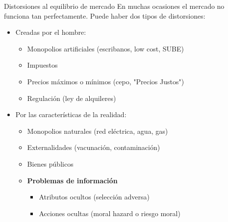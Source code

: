 \documentclass{beamer}
\begin{document}
\begin{frame}{Distorsiones al equilibrio de mercado}
    En muchas ocasiones el mercado no funciona tan perfectamente. Puede haber dos tipos de distorsiones: \vspace{1mm}
    \begin{itemize}
        \item Creadas por el hombre:
        \begin{itemize}
            \item Monopolios artificiales (escribanos, low cost, SUBE)
             \vspace{1mm}
             \item Impuestos
             \vspace{1mm}
            \item Precios máximos o mínimos (cepo, "Precios Justos")
             \vspace{1mm}
            \item Regulación (ley de alquileres)
        \end{itemize}
        \vspace{1mm}
        \item Por las características de la realidad:
        \begin{itemize}
            \item Monopolios naturales (red eléctrica, agua, gas)   
             \vspace{1mm}
            \item Externalidades (vacunación, contaminación)
             \vspace{1mm}
            \item Bienes públicos
            \vspace{1mm}
            \item \textbf{Problemas de información}
            \begin{itemize}
                \item Atributos ocultos (selección adversa)
                 \vspace{1mm}
                \item Acciones ocultas (moral hazard o riesgo moral)
            \end{itemize}        
        \end{itemize}
    \end{itemize}
\end{frame}
\end{document}
